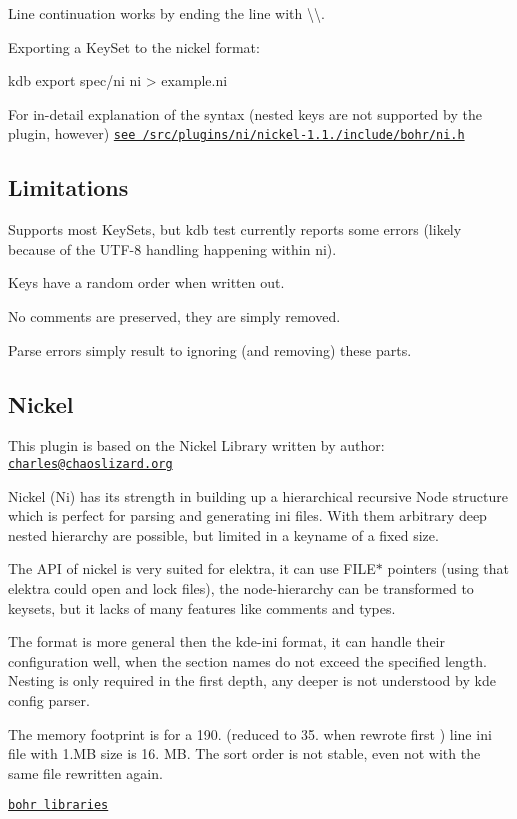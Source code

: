 Line continuation works by ending the line with {\ttfamily \textbackslash{}\textbackslash{}}.

Exporting a Key\+Set to the nickel format\+: \begin{DoxyVerb}kdb export spec/ni ni > example.ni
\end{DoxyVerb}


For in-\/detail explanation of the syntax (nested keys are not supported by the plugin, however) \href{/home/markus/Projekte/Elektra/current/src/plugins/ni/nickel-1.1.0/include/bohr/ni.h}{\tt see /src/plugins/ni/nickel-\/1.1./include/bohr/ni.h}

\subsection*{Limitations}


\begin{DoxyItemize}
\item Supports most Key\+Sets, but {\ttfamily kdb test} currently reports some errors (likely because of the U\+T\+F-\/8 handling happening within ni).
\item Keys have a random order when written out.
\item No comments are preserved, they are simply removed.
\item Parse errors simply result to ignoring (and removing) these parts.
\end{DoxyItemize}

\subsection*{Nickel}

This plugin is based on the Nickel Library written by author\+: \href{mailto:charles@chaoslizard.org}{\tt charles@chaoslizard.\+org}

Nickel (Ni) has its strength in building up a hierarchical recursive Node structure which is perfect for parsing and generating ini files. With them arbitrary deep nested hierarchy are possible, but limited in a keyname of a fixed size.

The A\+P\+I of nickel is very suited for elektra, it can use {\ttfamily F\+I\+L\+E$\ast$} pointers (using that elektra could open and lock files), the node-\/hierarchy can be transformed to keysets, but it lacks of many features like comments and types.

The format is more general then the kde-\/ini format, it can handle their configuration well, when the section names do not exceed the specified length. Nesting is only required in the first depth, any deeper is not understood by kde config parser.

The memory footprint is for a 190. (reduced to 35. when rewrote first ) line ini file with 1.\+M\+B size is 16. M\+B. The sort order is not stable, even not with the same file rewritten again.

\href{https://github.com/chazomaticus/bohr}{\tt bohr libraries} 